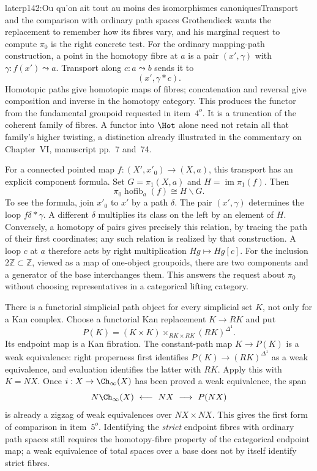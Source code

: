 \begin{dcomment}{later}{p142:Ou qu'on ait tout au moins des isomorphismes canoniques}{Transport and the comparison with ordinary path spaces}
Grothendieck wants the replacement to remember how its fibres vary, and his marginal request to compute $\pi_0$ is the right concrete test. For the ordinary mapping-path construction, a point in the homotopy fibre at $a$ is a pair $(x',\gamma)$ with $\gamma:f(x')\leadsto a$. Transport along $c:a\leadsto b$ sends it to
\[
                       (x',\gamma*c).
\]
Homotopic paths give homotopic maps of fibres; concatenation and reversal give composition and inverse in the homotopy category. This produces the functor from the fundamental groupoid requested in item~$4^o$. It is a truncation of the coherent family of fibres. A functor into $\Hot$ alone need not retain all that family's higher twisting, a distinction already illustrated in the commentary on Chapter~VI, manuscript pp.~7 and~74.

For a connected pointed map $f:(X',x'_0)\to(X,a)$, this transport has an explicit component formula. Set $G=\pi_1(X,a)$ and $H=\operatorname{im}\pi_1(f)$. Then
\[
                   \pi_0\operatorname{hofib}_a(f)\cong H\backslash G.
\]
To see the formula, join $x'_0$ to $x'$ by a path $\delta$. The pair $(x',\gamma)$ determines the loop $f\delta*\gamma$. A different $\delta$ multiplies its class on the left by an element of $H$. Conversely, a homotopy of pairs gives precisely this relation, by tracing the path of their first coordinates; any such relation is realized by that construction. A loop $c$ at $a$ therefore acts by right multiplication $Hg\mapsto Hg[c]$. For the inclusion $2\mathbb Z\subset\mathbb Z$, viewed as a map of one-object groupoids, there are two components and a generator of the base interchanges them. This answers the request about $\pi_0$ without choosing representatives in a categorical lifting category.

There is a functorial simplicial path object for every simplicial set $K$, not only for a Kan complex. Choose a functorial Kan replacement $K\to RK$ and put
\[
 P(K)=(K\times K)\times_{RK\times RK}(RK)^{\Delta^1}.
\]
Its endpoint map is a Kan fibration. The constant-path map $K\to P(K)$ is a weak equivalence: right properness first identifies $P(K)\to(RK)^{\Delta^1}$ as a weak equivalence, and evaluation identifies the latter with $RK$. Apply this with $K=NX$. Once $i:X\to\Ch_\infty(X)$ has been proved a weak equivalence, the span
\[
             N\Ch_\infty(X)\ \longleftarrow\ NX
                              \ \longrightarrow\ P(NX)
\]
is already a zigzag of weak equivalences over $NX\times NX$. This gives the first form of comparison in item~$5^o$. Identifying the \emph{strict} endpoint fibres with ordinary path spaces still requires the homotopy-fibre property of the categorical endpoint map; a weak equivalence of total spaces over a base does not by itself identify strict fibres.


\end{dcomment}
